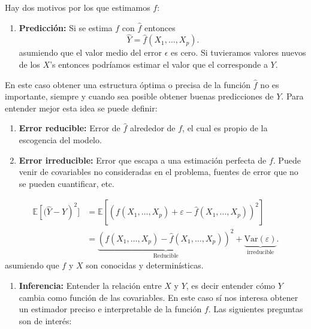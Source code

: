 \documentclass[
  12pt,
]{book}
\providecommand{\tightlist}{%
  \setlength{\itemsep}{0pt}\setlength{\parskip}{0pt}}
\begin{document}
Hay dos motivos por los que estimamos \(f\):

\begin{enumerate}
\def\labelenumi{\arabic{enumi}.}
\tightlist
\item
  \textbf{Predicción:} Si se estima \(f\) con \(\hat{f}\) entonces
  \begin{equation*}
  \hat{Y} = \hat{f}(X_{1},\ldots,X_{p}). 
  \end{equation*} asumiendo que el valor medio del error \(\epsilon\) es
  cero. Si tuvieramos valores nuevos de los \(X\)'s entonces podríamos
  estimar el valor que el corresponde a \(Y\).
\end{enumerate}

En este caso obtener una estructura óptima o precisa de la función
\(\hat f\) no es importante, siempre y cuando sea posible obtener buenas
predicciones de \(Y\). Para entender mejor esta idea se puede definir:

\begin{enumerate}
\def\labelenumi{\alph{enumi}.}
\tightlist
\item
  \textbf{Error reducible:} Error de \(\hat{f}\) alrededor de \(f\), el
  cual es propio de la escogencia del modelo.
\item
  \textbf{Error irreducible:} Error que escapa a una estimación perfecta
  de \(f\). Puede venir de covariables no consideradas en el problema,
  fuentes de error que no se pueden cuantificar, etc.
\end{enumerate}

\begin{align*}
\mathbb{E}\left[(\hat{Y}-Y\right)^2] 
&=  \mathbb{E}\left[\left(  f(X_{1},\ldots,X_{p}) + \varepsilon - \hat{f}(X_{1},\ldots,X_{p}) \right)^{2}  \right] \\
&= \underbrace{\left( f(X_{1},\ldots,X_{p})- \hat{f}(X_{1},\ldots,X_{p})  \right) ^{2} }_{\text{Reducible}}
+\underbrace{\mathrm{Var}\left(\varepsilon\right)}_{\text{irreducible}}.
\end{align*} asumiendo que \(f\) y \(X\) son conocidas y
determinísticas.

\begin{enumerate}
\def\labelenumi{\arabic{enumi}.}
\setcounter{enumi}{1}
\tightlist
\item
  \textbf{Inferencia:} Entender la relación entre \(X\) y \(Y\), es
  decir entender cómo \(Y\) cambia como función de las covariables. En
  este caso sí nos interesa obtener un estimador preciso e interpretable
  de la función \(f\). Las siguientes preguntas son de interés:
\end{enumerate}
\end{document}
